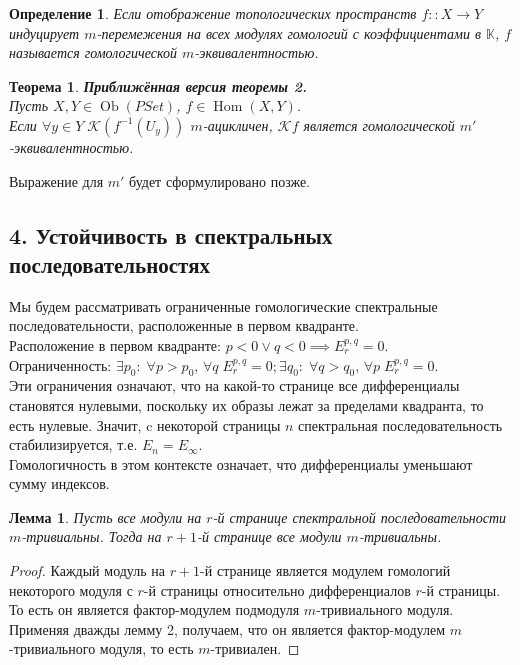 \documentclass[a4paper,12pt]{report}
\newtheorem{theorem}{Теорема}
\newtheorem{lemma}{Лемма}
\newtheorem{definition}{Определение}
\begin{document}
\begin{definition}
  Если отображение топологических пространств $f :: X \to Y$ индуцирует $m$-перемежения на всех модулях гомологий с коэффициентами в $\mathbb{K}$, $f$ называется гомологической $m$-эквивалентностью.
\end{definition}
\begin{theorem}
  \textbf{Приближённая версия теоремы 2.}\\
  Пусть $X, Y \in \operatorname{Ob}(PSet)$, $f \in \operatorname{Hom}(X,Y)$.\\
  Если $\forall y \in Y\;\mathcal{K}(f^{-1}(U_y))$ $m$-ацикличен, $\mathcal{K}f$ является гомологической $m'$-эквивалентностью.\\
\end{theorem}
Выражение для $m'$ будет сформулировано позже.
\subsection*{4. Устойчивость в спектральных последовательностях}
Мы будем рассматривать ограниченные гомологические спектральные последовательности, расположенные в первом квадранте.\\
Расположение в первом квадранте: $p < 0 \lor q < 0 \implies E_r^{p,q} = 0$.\\
Ограниченность: $\exists p_0:\;\forall p>p_0,\,\forall q\; E_r^{p,q} = 0; \exists q_0:\;\forall q>q_0,\,\forall p\; E_r^{p,q} = 0$.\\
Эти ограничения означают, что на какой-то странице все дифференциалы становятся нулевыми, поскольку их образы лежат за пределами квадранта, то есть нулевые. Значит, c некоторой страницы $n$ спектральная последовательность стабилизируется, т.е. $E_n = E_{\infty}$.\\
Гомологичность в этом контексте означает, что дифференциалы уменьшают сумму индексов.\\

\begin{lemma}
  Пусть все модули на $r$-й странице спектральной последовательности $m$-тривиальны. Тогда на $r+1$-й странице все модули $m$-тривиальны.
\end{lemma}
\begin{proof}
  Каждый модуль на $r+1$-й странице является модулем гомологий некоторого модуля с $r$-й страницы относительно дифференциалов $r$-й страницы. То есть он является фактор-модулем подмодуля $m$-тривиального модуля. Применяя дважды лемму 2, получаем, что он является фактор-модулем $m$-тривиального модуля, то есть $m$-тривиален.
\end{proof}
\end{document}
